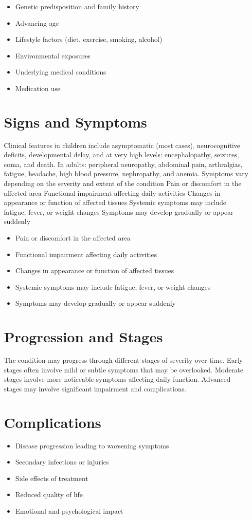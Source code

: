 \begin{itemize}[noitemsep]
  \item Genetic predisposition and family history
  \item Advancing age
  \item Lifestyle factors (diet, exercise, smoking, alcohol)
  \item Environmental exposures
  \item Underlying medical conditions
  \item Medication use
\end{itemize}
\section{Signs and Symptoms}
Clinical features in children include asymptomatic (most cases), neurocognitive deficits, developmental delay, and at very high levels: encephalopathy, seizures, coma, and death. In adults: peripheral neuropathy, abdominal pain, arthralgias, fatigue, headache, high blood pressure, nephropathy, and anemia. Symptoms vary depending on the severity and extent of the condition Pain or discomfort in the affected area Functional impairment affecting daily activities Changes in appearance or function of affected tissues Systemic symptoms may include fatigue, fever, or weight changes Symptoms may develop gradually or appear suddenly

\begin{itemize}[noitemsep]
  \item Pain or discomfort in the affected area
  \item Functional impairment affecting daily activities
  \item Changes in appearance or function of affected tissues
  \item Systemic symptoms may include fatigue, fever, or weight changes
  \item Symptoms may develop gradually or appear suddenly
\end{itemize}
\section{Progression and Stages}
The condition may progress through different stages of severity over time. Early stages often involve mild or subtle symptoms that may be overlooked. Moderate stages involve more noticeable symptoms affecting daily function. Advanced stages may involve significant impairment and complications.
\section{Complications}
\begin{itemize}[noitemsep]
  \item Disease progression leading to worsening symptoms
  \item Secondary infections or injuries
  \item Side effects of treatment
  \item Reduced quality of life
  \item Emotional and psychological impact
\end{itemize}
